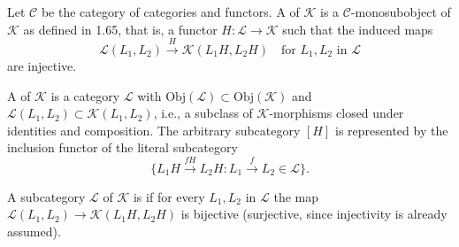Let $\mathcal{C}$ be the category of categories and functors. A  of $\mathcal{K}$ is a $\mathcal{C}$-monosubobject of $\mathcal{K}$ as defined in 1.65, that is, a functor $H: \mathcal{L} \longrightarrow \mathcal{K}$ such that the induced maps
$$\mathcal{L}(L_1, L_2) \xrightarrow{H} \mathcal{K}(L_1H, L_2H) \quad \text{for } L_1, L_2 \text{ in } \mathcal{L}$$
are injective.

A  of $\mathcal{K}$ is a category $\mathcal{L}$ with $\mathrm{Obj}(\mathcal{L}) \subset \mathrm{Obj}(\mathcal{K})$ and $\mathcal{L}(L_1, L_2) \subset \mathcal{K}(L_1, L_2)$, i.e., a subclass of $\mathcal{K}$-morphisms closed under identities and composition. The arbitrary subcategory $[H]$ is represented by the inclusion functor of the literal subcategory
$$\{L_1H \xrightarrow{fH} L_2H : L_1 \xrightarrow{f} L_2 \in \mathcal{L}\}.$$

A subcategory $\mathcal{L}$ of $\mathcal{K}$ is  if for every $L_1, L_2$ in $\mathcal{L}$ the map $\mathcal{L}(L_1, L_2) \longrightarrow \mathcal{K}(L_1H, L_2H)$ is bijective (surjective, since injectivity is already assumed).
